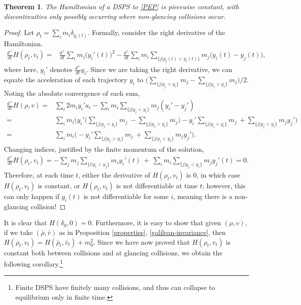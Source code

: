 \documentclass[11pt]{article}
\newtheorem{theorem}{Theorem}[section]
\numberwithin{equation}{section}
\begin{document}
        \begin{theorem}\label{energy-constant}
            The Hamiltonian of a DSPS to \eqref{PEP} is piecewise constant, with discontinuities only possibly occurring where non-glancing collisions occur. 
        \end{theorem}
        \begin{proof}
            Let $\rho_t=\sum_im_i\delta_{y_i(t)}$. Formally, consider the right derivative of the Hamiltonian. 
            \begin{align}\nonumber
                \frac{d^+}{dt}H(\rho_t,v_t) =& \frac{d^+}{dt}\sum_{i}m_i\big(y_i'(t)\big)^2-\frac{d^+}{dt}\sum_{i}m_i\sum_{\{j|y_j(t)<y_i(t)\}}m_j\big(y_i(t)-y_j(t)\big), 
            \end{align}
            where here, $y_i'$ denotes $\frac{d^{+}}{dt}y_i$. Since we are taking the right derivative, we can equate the acceleration of each trajectory $y_i$ to $\big(\sum_{\{j|y_j<y_i\}}m_j-\sum_{\{j|y_j>y_i\}}m_j\big)/2$. Noting the absolute convergence of each sum,
            \begin{align}
                \frac{d^+}{dt}H(\rho,v) =& \sum_{i}2m_iy_i'a_i-\sum_{i}m_i\sum_{\{j|y_j<y_i\}}m_j(y_i'-y_j')\nonumber
                \\
                =& \sum_{i}m_i\bigg(y_i'\big(\sum_{\{j|y_j<y_i\}}m_j\ -\sum_{\{j|y_j>y_i\}}m_j\big)-y_i'\sum_{\{j|y_j<y_i\}}m_j\ +\sum_{\{j|y_j<y_i\}}m_jy_j'\bigg)\nonumber
                \\
                =& \sum_{i}m_i\bigg(-y_i'\sum_{\{j|y_j>y_i\}}m_j\ +\sum_{\{j|y_j<y_i\}}m_jy_j'
                \bigg).\nonumber
            \end{align}
            Changing indices, justified by the finite momentum of the solution, 
            \begin{align}\nonumber
                \frac{d^+}{dt}H(\rho_t,v_t)=-\sum_{j}m_j\sum_{\{i|y_i<y_j\}}m_iy_i'(t)\ +\ \sum_{i}m_i\sum_{\{j|y_j<y_i\}}m_jy_j'(t)=0. 
            \end{align}
            Therefore, at each time $t$, either the derivative of $H(\rho_t,v_t)$ is $0$, in which case $H(\rho_t,v_t)$ is constant, or $H(\rho_t,v_t)$ is not differentiable at time $t$; however, this can only happen if $y_i(t)$ is not differentiable for some $i$, meaning there is a non-glancing collision!
        \end{proof}
        
        It is clear that $H(\delta_0,0)=0$. Furthermore, it is easy to show that given $(\rho,v)$, if we take $(\bar{\rho},\bar{v})$ as in Proposition \ref{properties}, \ref{galilean-invariance}, then $H(\rho_t,v_t)=H(\bar{\rho}_t,\bar{v}_t)+m_0^2$. Since we have now proved that $H(\rho_t,v_t)$ is constant both between collisions and at glancing collisions, we obtain the following corollary.\footnote{Finite DSPS have finitely many collisions, and thus can collapse to equilibrium only in finite time.}
        
\end{document}
